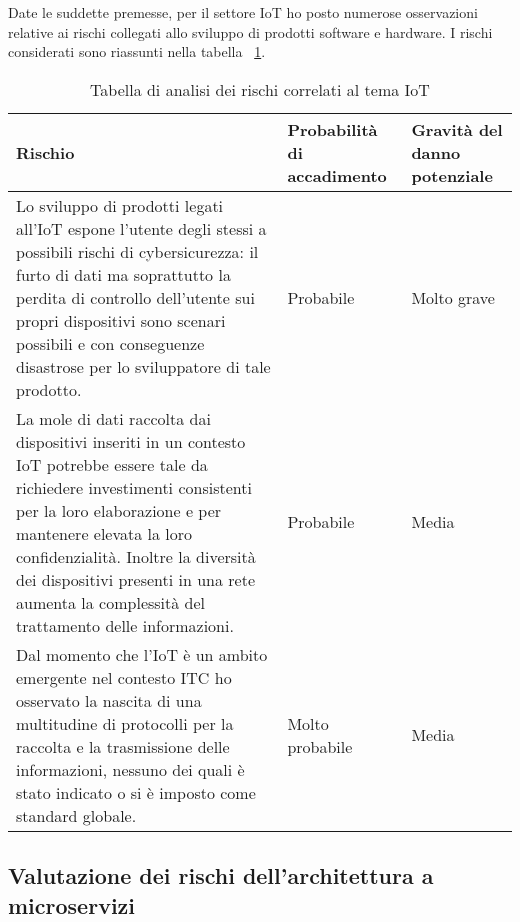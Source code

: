 Date le suddette premesse, per il settore IoT ho posto numerose osservazioni relative ai rischi collegati allo sviluppo di prodotti software e hardware. I rischi considerati sono riassunti nella tabella ~\ref{tab:rischi-iot}.
\begin{table}[H]
\caption{Tabella di analisi dei rischi correlati al tema IoT}
\label{tab:rischi-iot}
\begin{tabularx}{\linewidth}{|p{7.5cm}|X|X|}
\hline
\textbf{Rischio} & \textbf{Probabilità di accadimento} & \textbf{Gravità del danno potenziale}\\
\hline
Lo sviluppo di prodotti legati all'IoT espone l'utente degli stessi a possibili rischi di cybersicurezza: il furto di dati ma soprattutto la perdita di controllo dell'utente sui propri dispositivi sono scenari possibili e con conseguenze disastrose per lo sviluppatore di tale prodotto. & Probabile & Molto grave \\
\hline
La mole di dati raccolta dai dispositivi inseriti in un contesto IoT potrebbe essere tale da richiedere investimenti consistenti per la loro elaborazione e per mantenere elevata la loro confidenzialità. Inoltre la diversità dei dispositivi presenti in una rete aumenta la complessità del trattamento delle informazioni. & Probabile & Media \\
\hline
Dal momento che l'IoT è un ambito emergente nel contesto ITC ho osservato la nascita di una multitudine di protocolli per la raccolta e la trasmissione delle informazioni, nessuno dei quali è stato indicato o si è imposto come standard globale. & Molto probabile & Media \\
\hline
\end{tabularx}
\end{table}


\subsection{Valutazione dei rischi dell'architettura a microservizi}

